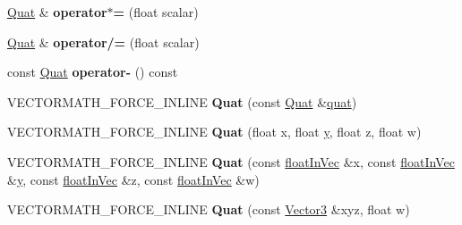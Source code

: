 \begin{DoxyCompactItemize}
\item 
\hypertarget{class_vectormath_1_1_aos_1_1_quat_ab5da49301367b36085a58c53734433c9}{\hyperlink{class_vectormath_1_1_aos_1_1_quat}{Quat} \& {\bfseries operator$\ast$=} (float scalar)}\label{class_vectormath_1_1_aos_1_1_quat_ab5da49301367b36085a58c53734433c9}

\item 
\hypertarget{class_vectormath_1_1_aos_1_1_quat_a5af07567b079fe049ca809335c5c3848}{\hyperlink{class_vectormath_1_1_aos_1_1_quat}{Quat} \& {\bfseries operator/=} (float scalar)}\label{class_vectormath_1_1_aos_1_1_quat_a5af07567b079fe049ca809335c5c3848}

\item 
\hypertarget{class_vectormath_1_1_aos_1_1_quat_ac98a921fa0caecefd842fef175f84f9b}{const \hyperlink{class_vectormath_1_1_aos_1_1_quat}{Quat} {\bfseries operator-\/} () const }\label{class_vectormath_1_1_aos_1_1_quat_ac98a921fa0caecefd842fef175f84f9b}

\item 
\hypertarget{class_vectormath_1_1_aos_1_1_quat_a102854a15448f2159ad8ed45e2573275}{V\+E\+C\+T\+O\+R\+M\+A\+T\+H\+\_\+\+F\+O\+R\+C\+E\+\_\+\+I\+N\+L\+I\+N\+E {\bfseries Quat} (const \hyperlink{class_vectormath_1_1_aos_1_1_quat}{Quat} \&\hyperlink{classquat}{quat})}\label{class_vectormath_1_1_aos_1_1_quat_a102854a15448f2159ad8ed45e2573275}

\item 
\hypertarget{class_vectormath_1_1_aos_1_1_quat_affbeca410d11cee6e77ea27c610ab386}{V\+E\+C\+T\+O\+R\+M\+A\+T\+H\+\_\+\+F\+O\+R\+C\+E\+\_\+\+I\+N\+L\+I\+N\+E {\bfseries Quat} (float x, float \hyperlink{_ice_utils_8h_aa7ffaed69623192258fb8679569ff9ba}{y}, float z, float w)}\label{class_vectormath_1_1_aos_1_1_quat_affbeca410d11cee6e77ea27c610ab386}

\item 
\hypertarget{class_vectormath_1_1_aos_1_1_quat_a72f6aa056be2f52ae1ff2175b3856060}{V\+E\+C\+T\+O\+R\+M\+A\+T\+H\+\_\+\+F\+O\+R\+C\+E\+\_\+\+I\+N\+L\+I\+N\+E {\bfseries Quat} (const \hyperlink{class_vectormath_1_1float_in_vec}{float\+In\+Vec} \&x, const \hyperlink{class_vectormath_1_1float_in_vec}{float\+In\+Vec} \&\hyperlink{_ice_utils_8h_aa7ffaed69623192258fb8679569ff9ba}{y}, const \hyperlink{class_vectormath_1_1float_in_vec}{float\+In\+Vec} \&z, const \hyperlink{class_vectormath_1_1float_in_vec}{float\+In\+Vec} \&w)}\label{class_vectormath_1_1_aos_1_1_quat_a72f6aa056be2f52ae1ff2175b3856060}

\item 
\hypertarget{class_vectormath_1_1_aos_1_1_quat_a8af91b1419e8548fc2d987fc662dce64}{V\+E\+C\+T\+O\+R\+M\+A\+T\+H\+\_\+\+F\+O\+R\+C\+E\+\_\+\+I\+N\+L\+I\+N\+E {\bfseries Quat} (const \hyperlink{class_vectormath_1_1_aos_1_1_vector3}{Vector3} \&xyz, float w)}\label{class_vectormath_1_1_aos_1_1_quat_a8af91b1419e8548fc2d987fc662dce64}


\end{DoxyCompactItemize}
